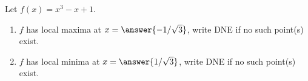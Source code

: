 \documentclass{ximera}
\author{Gregory Hartman \and Matthew Carr}
\begin{document}
\begin{exercise}






Let $f(x)=x^3-x+1$.
\begin{enumerate}
\item		$f$ has local maxima at $x=\answer{-1/\sqrt{3}}$, write DNE if no such point(s) exist.
\item		$f$ has local minima at $x=\answer{1/\sqrt{3}}$, write DNE if no such point(s) exist.
\end{enumerate}

\end{exercise}
\end{document}
